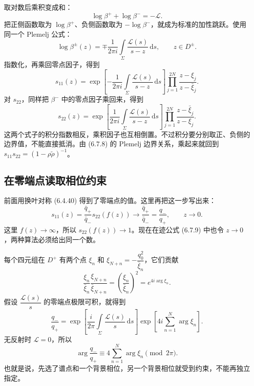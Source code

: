 \documentclass[lang=cn,scheme=chinese,mode=simple,device=normal,color=blue,math=cm,thmcnt=section,12pt]{elegantbook}
\newcommand{\dd}{\,\mathrm{d}}
\newcommand{\eqq}[2]{\tag{#1}\label{eq:#1}#2}
\begin{document}
取对数后乘积变成和：
\[
\log\beta^++\log\beta^-=-\mathcal L.
\]
把正侧函数取为 $\log\beta^+$、负侧函数取为 $-\log\beta^-$，就成为标准的加性跳跃。使用同一个 Plemelj 公式：
\begin{equation}\eqq{6.7.8}{\log\beta^\pm(z)
=\mp\dfrac{1}{2\pi i}\int\limits_\Sigma
\dfrac{\mathcal L(s)}{s-z}\dd s,\qquad z\in D^\pm.}\end{equation}
指数化，再乘回零点因子，得到
\begin{equation}\eqq{6.7.9}{s_{11}(z)=
\exp\left[-\dfrac{1}{2\pi i}\int\limits_\Sigma
\dfrac{\mathcal L(s)}{s-z}\dd s\right]
\prod\limits_{j=1}^{2N}\dfrac{z-\xi_j}{z-\bar\xi_j}.}\end{equation}
对 $s_{22}$，同样把 $\beta^-$ 中的零点因子乘回来，得到
\begin{equation}\eqq{6.7.10}{s_{22}(z)=
\exp\left[\dfrac{1}{2\pi i}\int\limits_\Sigma
\dfrac{\mathcal L(s)}{s-z}\dd s\right]
\prod\limits_{j=1}^{2N}\dfrac{z-\bar\xi_j}{z-\xi_j}.}\end{equation}
这两个式子的积分指数相反，乘积因子也互相倒置。不过积分要分别取正、负侧的边界值，不能直接抵消。由 (6.7.8) 的 Plemelj 边界关系，乘起来就回到
$s_{11}s_{22}=(1-\rho\widetilde\rho)^{-1}$。

\subsection*{在零端点读取相位约束}
前面用换叶对称 (6.4.40) 得到了零端点的值。这里再把这一步写出来：
\[
s_{11}(z)=\dfrac{\bar q_+}{\bar q_-}s_{22}(f(z))
\longrightarrow \dfrac{\bar q_+}{\bar q_-}=\dfrac{q_-}{q_+},
\qquad z\to0.
\]
这里 $f(z)\to\infty$，所以 $s_{22}(f(z))\to1$。现在在迹公式 (6.7.9) 中也令 $z\to0$，两种算法必须给出同一个数。

每个四元组在 $D^+$ 有两个点 $\xi_n$ 和 $\xi_{N+n}=-\dfrac{q_0^2}{\bar\xi_n}$，它们贡献
\[
\dfrac{\xi_n}{\bar\xi_n}
\dfrac{\xi_{N+n}}{\bar\xi_{N+n}}
=\left(\dfrac{\xi_n}{\bar\xi_n}\right)^2
=e^{4i\arg\xi_n}.
\]
假设 $\dfrac{\mathcal L(s)}{s}$ 的零端点极限可积，就得到
\begin{equation}\eqq{6.7.12}{\dfrac{q_-}{q_+}
=\exp\left[\dfrac{i}{2\pi}\int\limits_\Sigma
\dfrac{\mathcal L(s)}{s}\dd s\right]
\exp\left[4i\sum\limits_{n=1}^N\arg\xi_n\right].}\end{equation}
无反射时 $\mathcal L=0$，所以
\begin{equation}\eqq{6.7.14}{\arg\dfrac{q_-}{q_+}
\equiv4\sum\limits_{n=1}^N\arg\xi_n\pmod{2\pi}.}\end{equation}
也就是说，先选了谱点和一个背景相位，另一个背景相位就受到约束，不能再独立指定。
\end{document}
